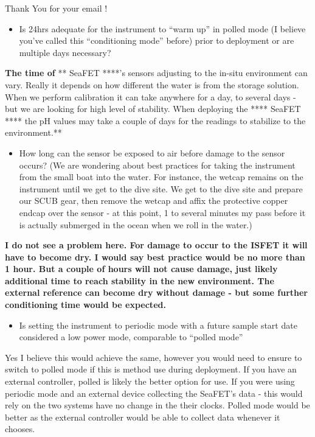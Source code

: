 \documentclass[]{book}
\providecommand{\tightlist}{%
  \setlength{\itemsep}{0pt}\setlength{\parskip}{0pt}}
\begin{document}
Thank You for your email !

\begin{itemize}
\tightlist
\item
  Is 24hrs adequate for the instrument to ``warm up'' in polled mode (I believe you've called this ``conditioning mode'' before) prior to deployment or are multiple days necessary?
\end{itemize}

\textbf{The time of }** SeaFET ****'s sensors adjusting to the in-situ environment can vary. Really it depends on how different the water is from the storage solution.
When we perform calibration it can take anywhere for a day, to several days - but we are looking for high level of stability.
When deploying the **** SeaFET **** the pH values may take a couple of days for the readings to stabilize to the environment.**

\begin{itemize}
\tightlist
\item
  How long can the sensor be exposed to air before damage to the sensor occurs? (We are wondering about best practices for taking the instrument from the small boat into the water. For instance, the wetcap remains on the instrument until we get to the dive site. We get to the dive site and prepare our SCUB gear, then remove the wetcap and affix the protective copper endcap over the sensor - at this point, 1 to several minutes my pass before it is actually submerged in the ocean when we roll in the water.)
\end{itemize}

\textbf{I do not see a problem here. For damage to occur to the ISFET it will have to become dry. I would say best practice would be no more than 1 hour. But a couple of hours will not cause damage, just likely additional time to reach stability in the new environment. The external reference can become dry without damage - but some further conditioning time would be expected.}

\begin{itemize}
\tightlist
\item
  Is setting the instrument to periodic mode with a future sample start date considered a low power mode, comparable to ``polled mode''
\end{itemize}

Yes I believe this would achieve the same, however you would need to ensure to switch to polled mode if this is method use during deployment.
If you have an external controller, polled is likely the better option for use. If you were using periodic mode and an external device collecting the SeaFET's data - this would rely on the two systems have no change in the their clocks. Polled mode would be better as the external controller would be able to collect data whenever it chooses.
\end{document}
